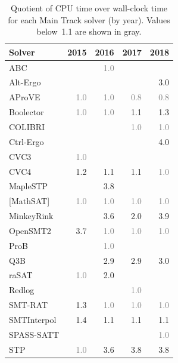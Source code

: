 \documentclass[dvipsnames,table,twoside,11pt]{article}
\newcommand{\maintrack}{Main Track\xspace}
\begin{document}
\begin{table}
  \caption{Quotient of CPU time over wall-clock time for each
    \maintrack solver (by year).  Values below~1.1 are shown in gray.}
  \label{table:parallelism}
  \centering
  \begin{tabular}{lrrrr}
    \toprule
    Solver & 2015 & 2016 & 2017 & 2018 \\
    \midrule
    ABC               &     & \textcolor{gray}{1.0} &     &     \\
    Alt-Ergo          &     &     &     & 3.0 \\
    AProVE            & \textcolor{gray}{1.0} & \textcolor{gray}{1.0} & \textcolor{gray}{0.8} & \textcolor{gray}{0.8} \\
    Boolector         & \textcolor{gray}{1.0} & \textcolor{gray}{1.0} & 1.1 & 1.3 \\
    COLIBRI           &     &     & \textcolor{gray}{1.0} & \textcolor{gray}{1.0} \\
    Ctrl-Ergo         &     &     &     & 4.0 \\
    CVC3              & \textcolor{gray}{1.0} &     &     &     \\
    CVC4              & 1.2 & 1.1 & 1.1 & \textcolor{gray}{1.0} \\
    MapleSTP          &     & 3.8 &     &     \\
    {[}MathSAT{]}     & \textcolor{gray}{1.0} & \textcolor{gray}{1.0} & \textcolor{gray}{1.0} & \textcolor{gray}{1.0} \\
    MinkeyRink        &     & 3.6 & 2.0 & 3.9 \\
    OpenSMT2          & 3.7 & \textcolor{gray}{1.0} & \textcolor{gray}{1.0} & \textcolor{gray}{1.0} \\
    ProB              &     & \textcolor{gray}{1.0} &     &     \\
    Q3B               &     & 2.9 & 2.9 & 3.0 \\
    raSAT             & \textcolor{gray}{1.0} & 2.0 &     &     \\
    Redlog            &     &     & \textcolor{gray}{1.0} &     \\
    SMT-RAT           & 1.3 & \textcolor{gray}{1.0} & \textcolor{gray}{1.0} & \textcolor{gray}{1.0} \\
    SMTInterpol       & 1.4 & 1.1 & 1.1 & 1.1 \\
    SPASS-SATT        &     &     &     & \textcolor{gray}{1.0} \\
    STP               & \textcolor{gray}{1.0} & 3.6 & 3.8 & 3.8 \\

\end{tabular}
\end{table}
\end{document}
